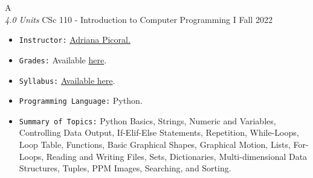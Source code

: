\cventry
{A \\ \small{\textit{4.0 Units}}}
{CSc 110 - Introduction to Computer Programming I}
{Fall 2022}
{}
{}
{
  \begin{itemize}
    \item \texttt{Instructor:} \href{https://adrianapicoral.com/}{Adriana Picoral.}
    \item \texttt{Grades:} Available \href{https://mhrezaei.com/assets/cv/courses/Fall2022/CSC110/Grades.pdf}{here}.
    \item \texttt{Syllabus:} \href{https://mhrezaei.com/assets/cv/courses/Fall2022/CSC110/Syllabus.pdf}{Available here}.
    \item \texttt{Programming Language:} Python.
    \item \texttt{Summary of Topics:} Python Basics, Strings, Numeric and Variables, Controlling Data Output, If-Elif-Else Statements, Repetition, While-Loops, Loop Table, Functions, Basic Graphical Shapes, Graphical Motion, Lists, For-Loops, Reading and Writing Files, Sets, Dictionaries, Multi-dimensional Data Structures, Tuples, PPM Images, Searching, and Sorting.
  \end{itemize}
}
